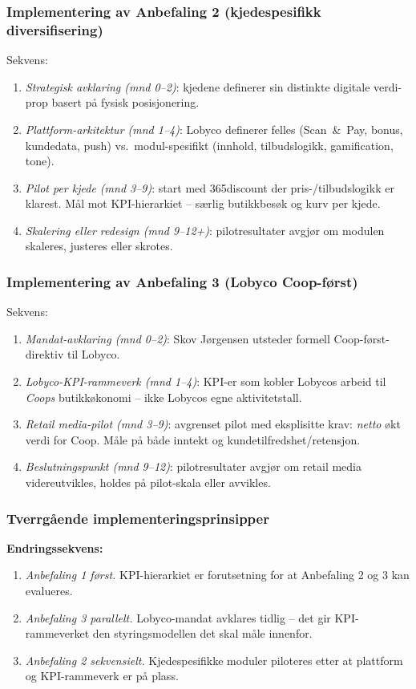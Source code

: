 \subsubsection*{Implementering av Anbefaling 2 (kjedespesifikk diversifisering)}
Sekvens:
\begin{enumerate}
  \item \emph{Strategisk avklaring (mnd 0--2)}: kjedene definerer sin
    distinkte digitale verdi-prop basert på fysisk posisjonering.
  \item \emph{Plattform-arkitektur (mnd 1--4)}: Lobyco definerer felles
    (Scan~\&~Pay, bonus, kundedata, push) vs.\ modul-spesifikt (innhold,
    tilbudslogikk, gamification, tone).
  \item \emph{Pilot per kjede (mnd 3--9)}: start med 365discount der
    pris-/tilbudslogikk er klarest. Mål mot KPI-hierarkiet -- særlig
    butikkbesøk og kurv per kjede.
  \item \emph{Skalering eller redesign (mnd 9--12+)}: pilotresultater
    avgjør om modulen skaleres, justeres eller skrotes.
\end{enumerate}

\subsubsection*{Implementering av Anbefaling 3 (Lobyco Coop-først)}
Sekvens:
\begin{enumerate}
  \item \emph{Mandat-avklaring (mnd 0--2)}: Skov Jørgensen utsteder formell
    Coop-først-direktiv til Lobyco.
  \item \emph{Lobyco-KPI-rammeverk (mnd 1--4)}: KPI-er som kobler Lobycos
    arbeid til \emph{Coops} butikkøkonomi -- ikke Lobycos egne
    aktivitetstall.
  \item \emph{Retail media-pilot (mnd 3--9)}: avgrenset pilot med
    eksplisitte krav: \emph{netto} økt verdi for Coop. Måle på både
    inntekt og kundetilfredshet/retensjon.
  \item \emph{Beslutningspunkt (mnd 9--12)}: pilotresultater avgjør om
    retail media videreutvikles, holdes på pilot-skala eller avvikles.
\end{enumerate}

\subsubsection*{Tverrgående implementeringsprinsipper}
\textbf{Endringssekvens:}
\begin{enumerate}
  \item \emph{Anbefaling 1 først.} KPI-hierarkiet er forutsetning for at
    Anbefaling 2 og 3 kan evalueres.
  \item \emph{Anbefaling 3 parallelt.} Lobyco-mandat avklares tidlig -- det
    gir KPI-rammeverket den styringsmodellen det skal måle innenfor.
  \item \emph{Anbefaling 2 sekvensielt.} Kjedespesifikke moduler piloteres
    etter at plattform og KPI-rammeverk er på plass.
\end{enumerate}

